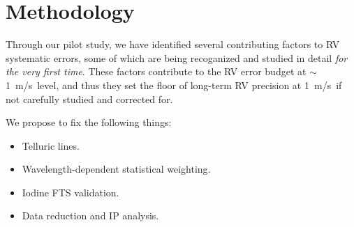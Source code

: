 \documentclass[12pt]{article}
\def\mps{m/s}
\def\kepler{{\it Kepler}}
\begin{document}

\vspace{-3pt}
\section{Methodology}


Through our pilot study, we have
identified several contributing factors to RV systematic errors,
some of which are being recoganized and studied in detail \textit{for the
very first time}. These factors contribute to the RV error budget at
$\sim$1~\mps\ level, and thus they set the floor of long-term RV
precision at 1~\mps\ if not carefully studied and corrected for.


We propose to fix the following things:
\begin{itemize}
  \item Telluric lines.
  \item Wavelength-dependent statistical weighting.
  \item Iodine FTS validation.
  \item Data reduction and IP analysis.
\end{itemize}
\end{document}
